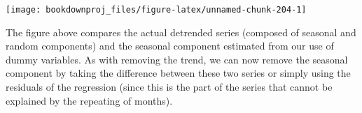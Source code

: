 \documentclass[
]{book}
\newenvironment{Shaded}{\begin{snugshade}}{\end{snugshade}}
\newcommand{\AttributeTok}[1]{\textcolor[rgb]{0.13,0.29,0.53}{#1}}
\newcommand{\ConstantTok}[1]{\textcolor[rgb]{0.56,0.35,0.01}{#1}}
\newcommand{\DecValTok}[1]{\textcolor[rgb]{0.00,0.00,0.81}{#1}}
\newcommand{\FunctionTok}[1]{\textcolor[rgb]{0.13,0.29,0.53}{\textbf{#1}}}
\newcommand{\NormalTok}[1]{#1}
\newcommand{\OtherTok}[1]{\textcolor[rgb]{0.56,0.35,0.01}{#1}}
\newcommand{\SpecialCharTok}[1]{\textcolor[rgb]{0.81,0.36,0.00}{\textbf{#1}}}
\newcommand{\StringTok}[1]{\textcolor[rgb]{0.31,0.60,0.02}{#1}}
\begin{document}
\begin{Shaded}
\end{Shaded}

\begin{center}\texttt{[image: bookdownproj\_files/figure-latex/unnamed-chunk-204-1]} \end{center}

The figure above compares the actual detrended series (composed of seasonal and random components) and the seasonal component estimated from our use of dummy variables. As with removing the trend, we can now remove the seasonal component by taking the difference between these two series or simply using the residuals of the regression (since this is the part of the series that cannot be explained by the repeating of months).
\end{document}
